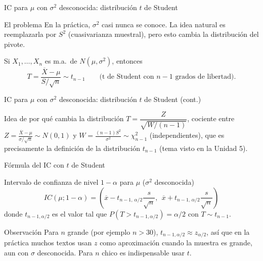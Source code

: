 \documentclass[aspectratio=169,11pt]{beamer}
\begin{document}
\begin{frame}{IC para $\mu$ con $\sigma^2$ desconocida: distribución $t$ de Student}
\begin{block}{El problema}
En la práctica, $\sigma^2$ casi nunca se conoce. La idea natural es reemplazarla por $S^2$ (cuasivarianza muestral), pero esto cambia la distribución del pivote.
\end{block}

\begin{theorem}
Si $X_1,\dots,X_n$ es m.a.\ de $N(\mu,\sigma^2)$, entonces
\[
T = \frac{\overline X - \mu}{S/\sqrt n} \sim t_{n-1} \qquad \text{(t de Student con $n-1$ grados de libertad)}.
\]
\end{theorem}

\end{frame}

\begin{frame}{IC para $\mu$ con $\sigma^2$ desconocida: distribución $t$ de Student (cont.)}
\begin{block}{Idea de por qué cambia la distribución}
$T = \dfrac{Z}{\sqrt{W/(n-1)}}$, cociente entre $Z=\frac{\overline X-\mu}{\sigma/\sqrt n}\sim N(0,1)$ y $W = \frac{(n-1)S^2}{\sigma^2}\sim \chi^2_{n-1}$ (independientes), que es precisamente la definición de la distribución $t_{n-1}$ (tema visto en la Unidad 5).
\end{block}
\end{frame}

\begin{frame}{Fórmula del IC con $t$ de Student}
\begin{alertblock}{Intervalo de confianza de nivel $1-\alpha$ para $\mu$ ($\sigma^2$ desconocida)}
\[
IC(\mu; 1-\alpha) = \left(\overline x - t_{n-1,\,\alpha/2}\frac{s}{\sqrt n},\ \ \overline x + t_{n-1,\,\alpha/2}\frac{s}{\sqrt n}\right)
\]
donde $t_{n-1,\alpha/2}$ es el valor tal que $P(T>t_{n-1,\alpha/2})=\alpha/2$ con $T\sim t_{n-1}$.
\end{alertblock}

\begin{block}{Observación}
Para $n$ grande (por ejemplo $n>30$), $t_{n-1,\alpha/2} \approx z_{\alpha/2}$, así que en la práctica muchos textos usan $z$ como aproximación cuando la muestra es grande, aun con $\sigma$ desconocida. Para $n$ chico es indispensable usar $t$.
\end{block}
\end{frame}
\end{document}
